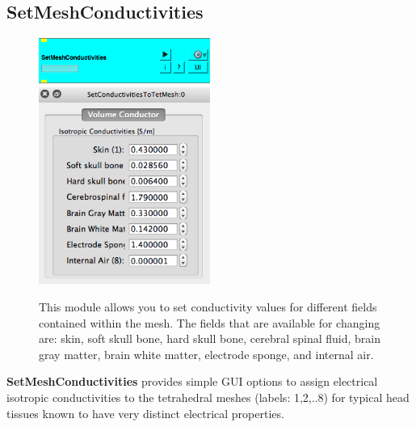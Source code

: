 \documentclass[fleqn,11pt,openany]{book}
\newcommand{\imgSm}{0.5}
\begin{document}
\subsection{SetMeshConductivities}
\begin{figure}[H]
	\centering
	\includegraphics[width=\imgSm\textwidth]{BrainStimulation_figures/SetMeshConductivities.png}
	\includegraphics[width=\imgSm\textwidth]{BrainStimulation_figures/SetMeshConductivities_GUI.png}
	\caption{This module allows you to set conductivity values for different fields contained within the mesh. The fields that are available for changing are: skin, soft skull bone, hard skull bone, cerebral spinal fluid, brain gray matter, brain white matter, electrode sponge, and internal air.}
	\label{fig:set_conductivities_tet_mesh}
\end{figure}

\textbf{SetMeshConductivities} provides simple GUI options to assign electrical isotropic conductivities to the tetrahedral meshes (labels: 1,2,..8) for 
typical head tissues known to have very distinct electrical properties.
\end{document}
